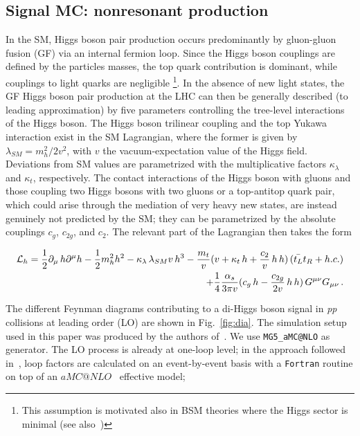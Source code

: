 \subsection{Signal MC: nonresonant production}
\label{sec:nonresMC}
In the SM, Higgs boson pair production occurs predominantly by gluon-gluon fusion (GF) via an internal fermion loop. 
Since the Higgs boson couplings are defined by the particles masses, the top quark contribution is dominant, while couplings to light quarks are negligible \footnote{This assumption is motivated also in BSM theories where the Higgs sector is minimal (see also~\cite{Goertz:2014qia})}. 
In the absence of new light states, the GF Higgs boson pair production at the LHC can then be generally described (to leading approximation) by five parameters controlling the tree-level interactions of the Higgs boson. 
The Higgs boson trilinear coupling and the top Yukawa interaction exist in the SM Lagrangian, where the former is given by $\lambda_{SM}=m_h^2/2v^2$, with $v$ the vacuum-expectation value of the Higgs field. Deviations from SM values are parametrized with the multiplicative factors $\kappa_{\lambda}$ and $\kappa_{t}$, respectively. The contact interactions of the Higgs boson with gluons and those coupling two Higgs bosons with two gluons or a top-antitop quark pair, which could arise through the mediation of very heavy new states, are instead genuinely not predicted by the SM; they can be parametrized by the absolute couplings $c_g$, $c_{2g}$, and $c_2$. The relevant part of the Lagrangian then takes the form \par

\begin{eqnarray}
{\cal L}_h = 
\frac{1}{2} \partial_{\mu}\, h \partial^{\mu} h - \frac{1}{2} m_h^2 h^2 -
  {\kappa_{\lambda}}\,  \lambda_{SM} v\, h^3 
- \frac{ m_t}{v}(v+   {\kappa_t} \,   h  +  \frac{c_{2}}{v}   \, h\,  h ) \,( \bar{t_L}t_R + h.c.) \nonumber  \\ 
+ \frac{1}{4} \frac{\alpha_s}{3 \pi v} (   c_g \, h -  \frac{c_{2g}}{2 v} \, h\, h ) \,  G^{\mu \nu}G_{\mu\nu}\,.
\label{eq:lag}
\end{eqnarray}

The different Feynman diagrams contributing to a di-Higgs boson signal in {\em pp} collisions at leading order (LO) are shown in Fig.~\ref{fig:dia}.
The simulation setup used in this paper was produced by the authors of~\cite{Hespel:2014sla}. We use {\tt MG5\_aMC@NLO} as generator. The LO process is already at one-loop level; in the approach followed in~\cite{Hespel:2014sla}, loop factors are calculated on an event-by-event basis with a {\tt Fortran} routine on top of an $aMC@NLO$~\cite{Frixione:2010ra, Alwall:2014hca} effective model;

